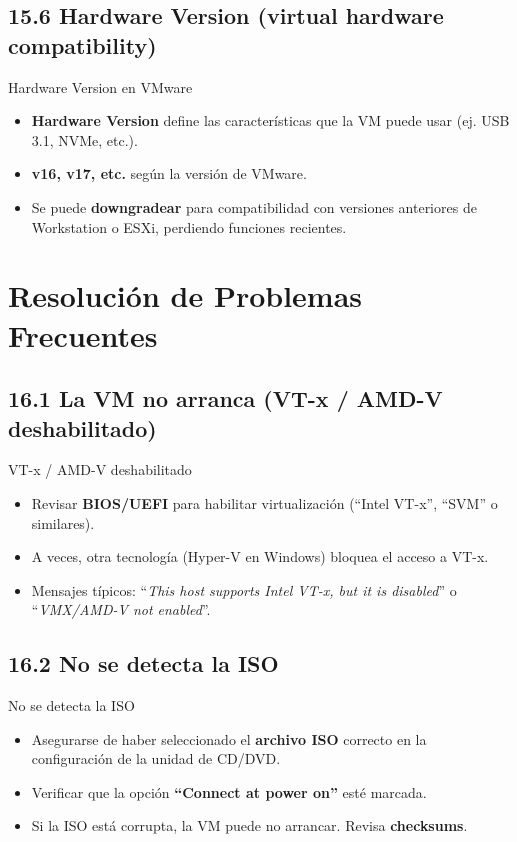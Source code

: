 \documentclass{beamer}
\begin{document}
\subsection{15.6 Hardware Version (virtual hardware compatibility)}
\begin{frame}{Hardware Version en VMware}
	\begin{itemize}
		\item \textbf{Hardware Version} define las características que la VM puede usar (ej. USB 3.1, NVMe, etc.).
		\item \textbf{v16, v17, etc.} según la versión de VMware.
		\item Se puede \textbf{downgradear} para compatibilidad con versiones anteriores de Workstation o ESXi, perdiendo funciones recientes.
	\end{itemize}
\end{frame}

\section{Resolución de Problemas Frecuentes}

\subsection{16.1 La VM no arranca (VT-x / AMD-V deshabilitado)}
\begin{frame}{VT-x / AMD-V deshabilitado}
	\begin{itemize}
		\item Revisar \textbf{BIOS/UEFI} para habilitar virtualización (“Intel VT-x”, “SVM” o similares).
		\item A veces, otra tecnología (Hyper-V en Windows) bloquea el acceso a VT-x.
		\item Mensajes típicos: “\textit{This host supports Intel VT-x, but it is disabled}” o “\textit{VMX/AMD-V not enabled}”.
	\end{itemize}
\end{frame}

\subsection{16.2 No se detecta la ISO}
\begin{frame}{No se detecta la ISO}
	\begin{itemize}
		\item Asegurarse de haber seleccionado el \textbf{archivo ISO} correcto en la configuración de la unidad de CD/DVD.
		\item Verificar que la opción \textbf{“Connect at power on”} esté marcada.
		\item Si la ISO está corrupta, la VM puede no arrancar. Revisa \textbf{checksums}.
	\end{itemize}
\end{frame}
\end{document}

